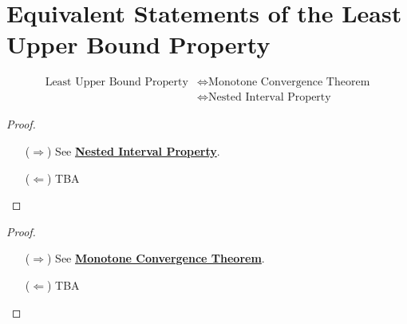 \documentclass[11pt,openany]{article}
\begin{document}
\newpage
\appendix
\section{Equivalent Statements of the Least Upper Bound Property}
\begin{align*}
\text{Least Upper Bound Property}&\iff\text{Monotone Convergence Theorem}\\
&\iff\text{Nested Interval Property}
\end{align*}

\begin{proof}
\begin{enumerate}
\item[($\Rightarrow$)] See \hyperlink{nip}{\textbf{Nested Interval Property}}.
\item[($\Leftarrow$)] TBA
\end{enumerate}
\end{proof}
\begin{proof}
\begin{enumerate}
\item[($\Rightarrow$)] See \hyperlink{mct}{\textbf{Monotone Convergence Theorem}}.
\item[($\Leftarrow$)] TBA
\end{enumerate}
\end{proof}
\end{document}
